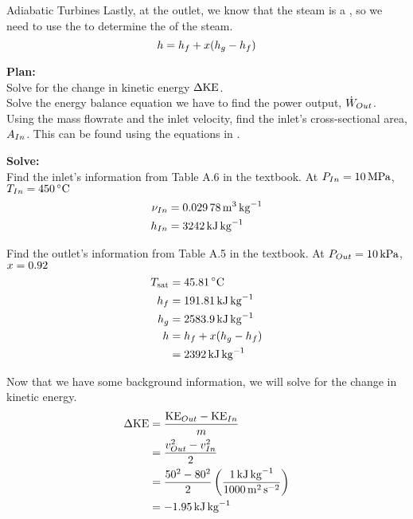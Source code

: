 \begin{example}{Adiabatic Turbines}
  Lastly, at the outlet, we know that the steam is a , so we need to use the  to determine the  of the steam.
  \begin{equation*}
    h = h_{f} + x(h_{g} - h_{f})
  \end{equation*}

  \textbf{Plan:} \\
  Solve for the change in kinetic energy $\Delta \mathrm{KE}$. \\
  Solve the energy balance equation we have to find the power output, $\dot{W}_{Out}$. \\
  Using the mass flowrate and the inlet velocity, find the inlet's cross-sectional area, $A_{In}$.
  This can be found using the equations in .

  \textbf{Solve:} \\
  Find the inlet's information from Table A.6 in the textbook.
  At $P_{In} = \SI{10}{\mega\pascal}$, $\Temp_{In} = \SI{450}{\degreeCelsius}$
  \begin{align*}
    \nu_{In} &= \SI{0.02978}{\meter\cubed\per\kilo\gram} \\
    h_{In} &= \SI{3242}{\kilo\joule\per\kilo\gram}
  \end{align*}

  Find the outlet's information from Table A.5 in the textbook.
  At $P_{Out} = \SI{10}{\kilo\pascal}$, $x = 0.92$
  \begin{align*}
    \SaturatedTemp &= \SI{45.81}{\degreeCelsius} \\
    \Fluid{\SpecificEnthalpy} &= \SI{191.81}{\kilo\joule\per\kilo\gram} \\
    \Vapor{\SpecificEnthalpy} &= \SI{2583.9}{\kilo\joule\per\kilo\gram} \\
    \SpecificEnthalpy &= \Fluid{\SpecificEnthalpy} + \Quality (\Vapor{\SpecificEnthalpy} - \Fluid{\SpecificEnthalpy}) \\
    &= \SI{2392}{\kilo\joule\per\kilo\gram}
  \end{align*}

  Now that we have some background information, we will solve for the change in kinetic energy.
  \begin{align*}
    \Delta \mathrm{KE} &= \frac{\mathrm{KE}_{Out} - \mathrm{KE}_{In}}{m} \\
                            &= \frac{v_{Out}^{2} - v_{In}^{2}}{2} \\
                            &= \frac{50^{2} - 80^{2}}{2} \left( \frac{\SI{1}{\kilo\joule\per\kilo\gram}}{\SI{1000}{\meter\squared\per\second\squared}} \right) \\
    &= \SI{-1.95}{\kilo\joule\per\kilo\gram}
  \end{align*}


\end{example}
